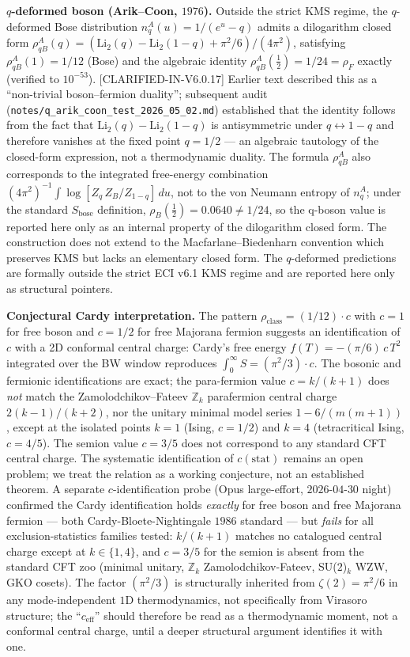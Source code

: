 \documentclass[reprint,amsmath,amssymb,aps,prd,superscriptaddress]{revtex4-2}
\providecommand{\1}{\mathbf{1}}
\begin{document}
\smallskip
\noindent\textbf{$q$-deformed boson (Arik--Coon, $1976$).} Outside the strict KMS regime, the
$q$-deformed Bose distribution $n_q^A(u) = 1/(e^u-q)$ admits a dilogarithm closed form
$\rho_{qB}^A(q) = (\mathrm{Li}_2(q) - \mathrm{Li}_2(1-q) + \pi^2/6)/(4\pi^2)$, satisfying
$\rho_{qB}^A(1) = 1/12$ (Bose) and the algebraic identity $\rho_{qB}^A(\tfrac{1}{2}) = 1/24
= \rho_F$ exactly (verified to $10^{-53}$).
[CLARIFIED-IN-V6.0.17] Earlier text described this as a ``non-trivial
boson--fermion duality''; subsequent audit (\texttt{notes/q\_arik\_coon\_test\_2026\_05\_02.md})
established that the identity follows from the fact that $\mathrm{Li}_2(q)-\mathrm{Li}_2(1-q)$
is antisymmetric under $q\leftrightarrow 1-q$ and therefore vanishes at the fixed point $q=1/2$
--- an algebraic tautology of the closed-form expression, not a thermodynamic duality. The
formula $\rho_{qB}^A$ also corresponds to the integrated free-energy combination
$(4\pi^2)^{-1}\!\int \log[Z_q\,Z_B / Z_{1-q}]\,du$, not to the von Neumann entropy of $n_q^A$;
under the standard $S_\mathrm{bose}$ definition, $\rho_B(\tfrac{1}{2}) = 0.0640 \neq 1/24$, so
the q-boson value is reported here only as an internal property of the dilogarithm closed form.
The construction does not extend to the Macfarlane--Biedenharn
convention which preserves KMS but lacks an elementary closed form. The $q$-deformed predictions
are formally outside the strict ECI v6.1 KMS regime and are reported here only as structural
pointers.

\smallskip
\noindent\textbf{Conjectural Cardy interpretation.} The pattern $\rho_\mathrm{class} = (1/12)\cdot c$
with $c=1$ for free boson and $c=1/2$ for free Majorana fermion suggests an identification of
$c$ with a 2D conformal central charge: Cardy's free energy $f(T)=-(\pi/6)\,c\,T^2$ integrated
over the BW window reproduces $\int_0^\infty S = (\pi^2/3)\cdot c$. The bosonic and fermionic
identifications are exact; the para-fermion value $c=k/(k+1)$ does \emph{not} match the
Zamolodchikov--Fateev $\mathbb{Z}_k$ parafermion central charge $2(k-1)/(k+2)$, nor the unitary
minimal model series $1-6/(m(m+1))$, except at the isolated points $k=1$ (Ising, $c{=}1/2$) and
$k=4$ (tetracritical Ising, $c{=}4/5$). The semion value $c{=}3/5$ does not correspond to any
standard CFT central charge. The systematic identification of $c(\mathrm{stat})$ remains an
open problem; we treat the relation as a working conjecture, not an established theorem.
A separate $c$-identification probe (Opus large-effort, $2026$-$04$-$30$ night) confirmed the Cardy
identification holds \emph{exactly} for free boson and free Majorana fermion --- both Cardy-Bloete-Nightingale
$1986$ standard --- but \emph{fails} for all exclusion-statistics families tested: $k/(k+1)$ matches
no catalogued central charge except at $k\in\{1,4\}$, and $c{=}3/5$ for the semion is absent from
the standard CFT zoo (minimal unitary, $\mathbb{Z}_k$ Zamolodchikov-Fateev, SU($2$)$_k$ WZW, GKO
cosets). The factor $(\pi^2/3)$ is structurally inherited from $\zeta(2){=}\pi^2/6$ in any
mode-independent $1$D thermodynamics, not specifically from Virasoro structure; the
``$c_{\mathrm{eff}}$'' should therefore be read as a thermodynamic moment, not a conformal central
charge, until a deeper structural argument identifies it with one.
\end{document}

